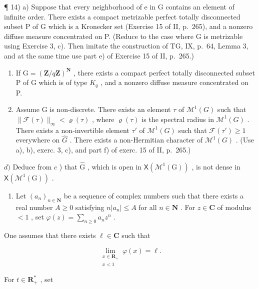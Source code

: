 ¶ 14) a) Suppose that every neighborhood of e in G contains an element of infinite order. There exists a compact metrizable perfect totally disconnected subset P of G which is a Kronecker set (Exercise 15 of II, p.~265), and a nonzero diffuse measure concentrated on P. (Reduce to the case where G is metrizable using Exercise 3, c). Then imitate the construction of TG, IX, p.~64, Lemma 3, and at the same time use part e) of Exercise 15 of II, p.~265.)

\begin{enumerate}
\def\labelenumi{\alph{enumi})}
\setcounter{enumi}{1}
\item
  If \(\mathrm{G} = (\mathbf{Z}/q\mathbf{Z})^{\mathbf{N}}\) , there exists a compact perfect totally disconnected subset P of G which is of type \(K_{q}\) , and a nonzero diffuse measure concentrated on P.
\item
  Assume G is non-discrete. There exists an element \(\tau\) of \(\mathcal{M}^{1}(G)\) such that \(\|\mathcal{F}(\tau)\|_{\infty}<\varrho(\tau)\) , where \(\varrho(\tau)\) is the spectral radius in \(\mathcal{M}^{1}(G)\) . There exists a non-invertible element \(\tau'\) of \(\mathcal{M}^{1}(G)\) such that \(\mathcal{F}(\tau')\geqslant1\) everywhere on \(\widehat{G}\) . There exists a non-Hermitian character of \(\mathcal{M}^{1}(G)\) . (Use a), b), exerc. 3, c), and part f) of exerc. 15 of II, p.~265.)
\end{enumerate}

\(d)\) Deduce from \(c\) ) that \(\widehat{\mathrm{G}}\) , which is open in \(\mathsf{X}(\mathcal{M}^1 (\mathrm{G}))\) , is not dense in \(\mathsf{X}(\mathcal{M}^1 (\mathrm{G}))\) .


\begin{enumerate}
\def\labelenumi{\arabic{enumi})}
\tightlist
\item
  Let \((a_{n})_{n\in \mathbf{N}}\) be a sequence of complex numbers such that there exists a real number \(A\geqslant 0\) satisfying \(n|a_n|\leqslant A\) for all \(n\in \mathbf{N}\) . For \(z\in \mathbf{C}\) of modulus \(<  1\) , set \(\varphi (z) = \sum_{n\geqslant 0}a_nz^n\) .
\end{enumerate}

One assumes that there exists \(\ell \in \mathbf{C}\) such that

\[
\lim_{\substack{x\in \mathbf{R}_{+}\\ x <   1}}\varphi (x) = \ell .
\]

For \(t\in \mathbf{R}_+^*\) , set

